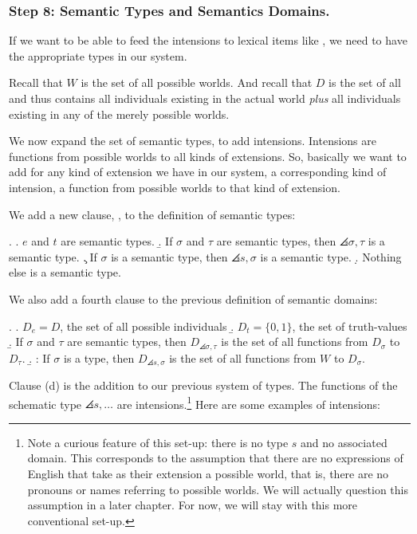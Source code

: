 \subsubsection{Step 8: Semantic Types and Semantics Domains.} \label{sec:semantic-types}

If we want to be able to feed the intensions to lexical items like , we need to have the appropriate types in our system.

Recall that $W$ is the set of all possible worlds. And recall that $D$ is the set of all  and thus contains all individuals existing in the actual world \emph{plus} all individuals existing in any of the merely possible worlds.

We now expand the set of semantic types, to add intensions. Intensions are functions from possible worlds to all kinds of extensions. So, basically we want to add for any kind of extension we have in our system, a corresponding kind of intension, a function from possible worlds to that kind of extension. 

We add a new clause, \Next[c], to the definition of semantic types:

\ex. 
\a. $e$ and $t$ are semantic types.
\b. If $\sigma$ and $\tau$ are semantic types, then $\angles{\sigma,\tau}$ is a semantic type.
\c. If $\sigma$ is a semantic type, then $\angles{s,\sigma}$ is a semantic type.
\d. Nothing else is a semantic type.

We also add a fourth clause to the previous definition of semantic domains:

\ex.  \a. $D_{e} = D$, the set of all possible individuals \b. $D_{t} = \{0,1\}$, the set of truth-values \b. If $\sigma$ and $\tau$ are semantic types, then $D_{\angles{\sigma,\tau}}$ is the set of all functions from $D_{\sigma}$ to $D_{\tau}$. \b. : If $\sigma$ is a type, then $D_{\angles{s,\sigma}}$ is the set of all functions from $W$ to $D_{\sigma}$.

Clause (d) is the addition to our previous system of types. The functions of the schematic type $\angles{s,\dots}$ are intensions.\footnote{Note a curious feature of this set-up: there is no type $s$ and no associated domain. This corresponds to the assumption that there are no expressions of English that take as their extension a possible world, that is, there are no pronouns or names referring to possible worlds. We will actually question this assumption in a later chapter. For now, we will stay with this more conventional set-up.} Here are some examples of intensions:

